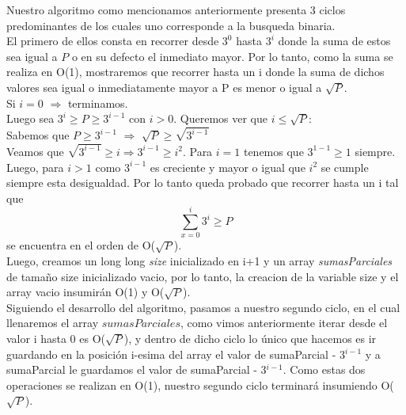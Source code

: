 
Nuestro algoritmo como mencionamos anteriormente presenta 3 ciclos predominantes de los cuales uno corresponde a la busqueda binaria.\\
El primero de ellos consta en recorrer desde $3^0$ hasta $3^i$ donde la suma de estos sea igual a $P$ o en su defecto el inmediato mayor. Por lo tanto, como la suma se realiza en O(1), mostraremos que recorrer hasta un i donde la suma de dichos valores sea igual o inmediatamente mayor a P es menor o igual a $\sqrt{P}$.\\

Si $i = 0$ $\Rightarrow$ terminamos.\\
Luego sea $3^i \geq P \geq 3^{i-1}$ con $i > 0$. Queremos ver que $i \leq \sqrt{P}$:\\
Sabemos que $P \geq 3^{i-1}$ $\Rightarrow$ $\sqrt{P} \geq \sqrt{3^{i-1}}$\\
Veamos que $\sqrt{3^{i-1}} \geq i \Rightarrow 3^{i-1} \geq {i^2}$. Para $i = 1$ tenemos que $3^{1-1} \geq 1$ siempre. Luego, para $i > 1$ como ${3^{i-1}}$ es creciente y mayor o igual que $i^2$ se cumple siempre esta desigualdad. Por lo tanto queda probado que recorrer hasta un i tal que \[
\sum_{x=0}^{i}3^{i} \geq P \] se encuentra en el orden de  O($\sqrt{P}$).\\

 Luego, creamos un long long \textit{size} inicializado en i+1 y un array \textit{sumasParciales} de tamaño size inicializado vacio, por lo tanto, la creacion de la variable size y el array vacio insumir\'an O(1) y O($\sqrt{P}$).\\
 
Siguiendo el desarrollo del algoritmo, pasamos a nuestro segundo ciclo, en el cual llenaremos el array $sumasParciales$, como vimos anteriormente iterar desde el valor i hasta 0 es O($\sqrt{P}$), y dentro de dicho ciclo lo \'unico que hacemos es ir guardando en la posici\'on i-esima del array el valor de sumaParcial - 3$^{i-1}$ y a sumaParcial le guardamos el valor de sumaParcial - 3$^{i-1}$. Como estas dos operaciones se realizan en O(1), nuestro segundo ciclo terminar\'a insumiendo O($\sqrt{P}$).\\

